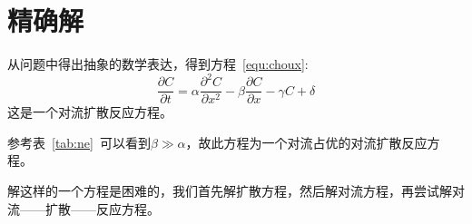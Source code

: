 \chapter{精确解}
从问题中得出抽象的数学表达，得到方程~\ref{equ:choux}:
\begin{equation}\label{equ:choux}
	\dfrac{\partial C}{\partial t}= \alpha\dfrac{\partial^2 C}{\partial x^2}-\beta\dfrac{\partial C}{\partial x}-\gamma C + \delta
\end{equation}
这是一个对流扩散反应方程。\par
参考表~\ref{tab:ne}~可以看到$\beta\gg\alpha$，故此方程为一个对流占优的对流扩散反应方程。\par
解这样的一个方程是困难的，我们首先解扩散方程，然后解对流方程，再尝试解对流——扩散——反应方程。
